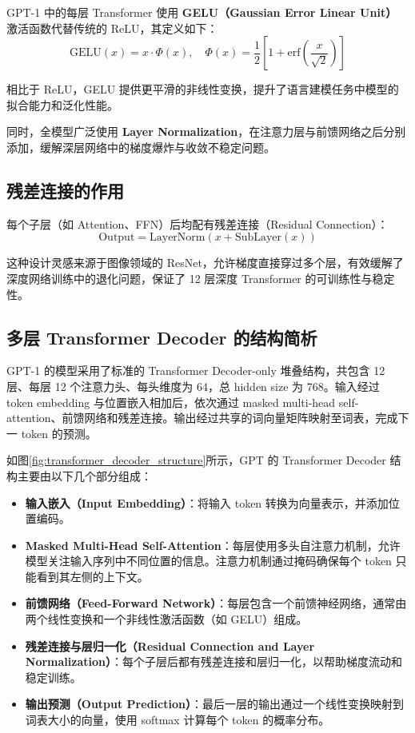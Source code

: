 \documentclass[a4paper,12pt]{article}
\begin{document}
GPT-1 中的每层 Transformer 使用 \textbf{GELU（Gaussian Error Linear Unit）} 激活函数代替传统的 ReLU，其定义如下：
\[
\text{GELU}(x) = x \cdot \Phi(x), \quad \Phi(x) = \frac{1}{2} \left[1 + \text{erf}\left(\frac{x}{\sqrt{2}}\right)\right]
\]

相比于 ReLU，GELU 提供更平滑的非线性变换，提升了语言建模任务中模型的拟合能力和泛化性能。

同时，全模型广泛使用 \textbf{Layer Normalization}，在注意力层与前馈网络之后分别添加，缓解深层网络中的梯度爆炸与收敛不稳定问题。

\subsection{残差连接的作用}

每个子层（如 Attention、FFN）后均配有残差连接（Residual Connection）：
\[
\text{Output} = \text{LayerNorm}(x + \text{SubLayer}(x))
\]

这种设计灵感来源于图像领域的 ResNet，允许梯度直接穿过多个层，有效缓解了深度网络训练中的退化问题，保证了 12 层深度 Transformer 的可训练性与稳定性。



\subsection{多层 Transformer Decoder 的结构简析}

GPT-1 的模型采用了标准的 Transformer Decoder-only 堆叠结构，共包含 12 层、每层 12 个注意力头、每头维度为 64，总 hidden size 为 768。输入经过 token embedding 与位置嵌入相加后，依次通过 masked multi-head self-attention、前馈网络和残差连接。输出经过共享的词向量矩阵映射至词表，完成下一 token 的预测。

如图\ref{fig:transformer_decoder_structure}所示，GPT 的 Transformer Decoder 结构主要由以下几个部分组成：
\begin{itemize}
    \item \textbf{输入嵌入（Input Embedding）}：将输入 token 转换为向量表示，并添加位置编码。
    \item \textbf{Masked Multi-Head Self-Attention}：每层使用多头自注意力机制，允许模型关注输入序列中不同位置的信息。注意力机制通过掩码确保每个 token 只能看到其左侧的上下文。
    \item \textbf{前馈网络（Feed-Forward Network）}：每层包含一个前馈神经网络，通常由两个线性变换和一个非线性激活函数（如 GELU）组成。
    \item \textbf{残差连接与层归一化（Residual Connection and Layer Normalization）}：每个子层后都有残差连接和层归一化，以帮助梯度流动和稳定训练。
    \item \textbf{输出预测（Output Prediction）}：最后一层的输出通过一个线性变换映射到词表大小的向量，使用 softmax 计算每个 token 的概率分布。
\end{itemize}
\end{document}
